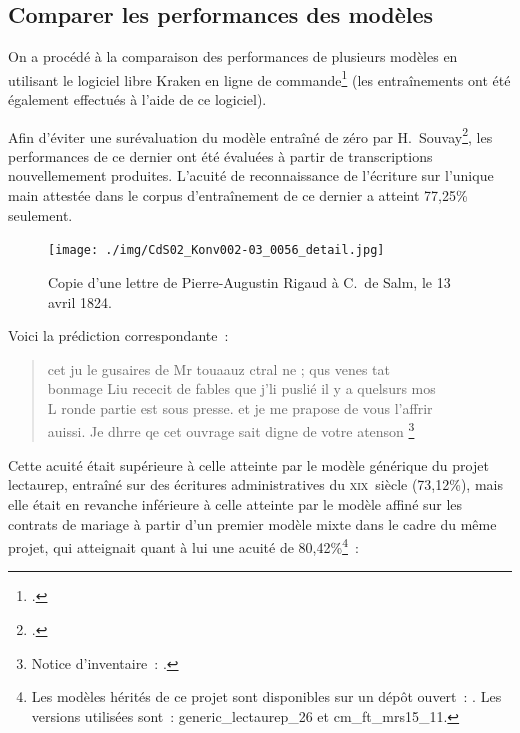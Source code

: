 \documentclass[a4paper,12pt,twoside]{book}
\newcommand{\siecle}[1]{\textsc{#1}\ieme}
\begin{document}
			\subsection{Comparer les performances des modèles}
				On a procédé à la comparaison des performances de plusieurs modèles en utilisant le logiciel libre Kraken en ligne de commande\footcite{KrakenDocumentation} (les entraînements ont été également effectués à l'aide de ce logiciel).
				
				Afin d'éviter une surévaluation du modèle entraîné de zéro par H.~Souvay\footcite{souvayCorrespondanceConstanceSalm2021}, les performances de ce dernier ont été évaluées à partir de transcriptions nouvellemement produites. L'acuité de reconnaissance de l'écriture sur l'unique main attestée dans le corpus d'entraînement de ce dernier a atteint 77,25\% seulement. 
				
				\begin{figure}[!h]
					\centering
					\texttt{[image: ./img/CdS02\_Konv002-03\_0056\_detail.jpg]}%
					\caption{Copie d'une lettre de Pierre-Augustin Rigaud à C.~de Salm, le 13 avril 1824.}%
					\label{lettre-rigaud}%
				\end{figure}
				
				Voici la \gls{prédiction} correspondante~:
				
				\begin{quote}
					\textsf{cet ju le gusaires de Mr touaauz ctral ne ; qus venes tat\\
					bonmage Liu rececit de fables que j'li puslié il y a quelsurs mos\\
					L ronde partie est sous presse. et je me prapose de vous l'affrir\\
					auissi. Je dhrre qe cet ouvrage sait digne de votre atenson
					\footnote{Notice d'inventaire~: \cite{CdS02056}.}}
				\end{quote}
				
				Cette acuité était supérieure à celle atteinte par le modèle générique du projet \gls{lectaurep}, entraîné sur des écritures administratives du \siecle{xix}~siècle (73,12\%), mais elle était en revanche inférieure à celle atteinte par le modèle affiné sur les contrats de mariage à partir d'un premier modèle mixte dans le cadre du même projet, qui atteignait quant à lui une acuité de 80,42\%\footnote{Les modèles hérités de ce projet sont disponibles sur un dépôt ouvert~: \cite{KrakenModelsTranscription}. Les versions utilisées sont~: \textsf{generic\_lectaurep\_26} et \textsf{cm\_ft\_mrs15\_11}.}~:
				
\end{document}
